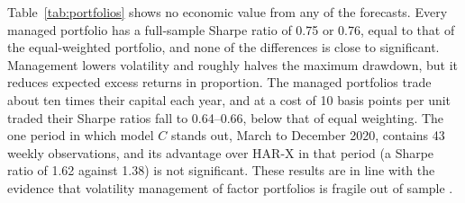 

Table~\ref{tab:portfolios} shows no economic value from any of the forecasts.
Every managed portfolio has a full-sample Sharpe ratio of 0.75 or 0.76, equal
to that of the equal-weighted portfolio, and none of the differences is close
to significant. Management lowers volatility and roughly halves the maximum
drawdown, but it reduces expected excess returns in proportion. The managed
portfolios trade about ten times their capital each year, and at a cost of
10 basis points per unit traded their Sharpe ratios fall to 0.64--0.66, below
that of equal weighting. The one period in which model $C$ stands out, March
to December 2020, contains 43 weekly observations, and its advantage over
HAR-X in that period (a Sharpe ratio of 1.62 against 1.38) is not
significant. These results are in line with the evidence that volatility
management of factor portfolios is fragile out of sample
\citep{cederburg2020volatility, barroso2021volatility}.
